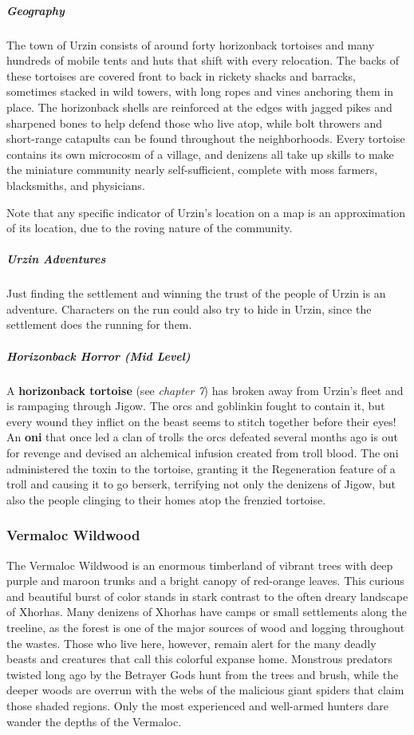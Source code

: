 \documentclass[10pt,a4paper,twoside,bg=print,twocolumn,openany,nodeprecatedcode]{dndbook}
\begin{document}
\subparagraph{Geography}
The town of Urzin consists of around forty horizonback tortoises and many hundreds of mobile tents and huts that shift with every relocation. The backs of these tortoises are covered front to back in rickety shacks and barracks, sometimes stacked in wild towers, with long ropes and vines anchoring them in place. The horizonback shells are reinforced at the edges with jagged pikes and sharpened bones to help defend those who live atop, while bolt throwers and short-range catapults can be found throughout the neighborhoods. Every tortoise contains its own microcosm of a village, and denizens all take up skills to make the miniature community nearly self-sufficient, complete with moss farmers, blacksmiths, and physicians.

Note that any specific indicator of Urzin's location on a map is an approximation of its location, due to the roving nature of the community.

\subparagraph{Urzin Adventures}
Just finding the settlement and winning the trust of the people of Urzin is an adventure. Characters on the run could also try to hide in Urzin, since the settlement does the running for them.

\subparagraph{Horizonback Horror (Mid Level)}
A \textbf{horizonback tortoise} (see \textit{chapter 7}) has broken away from Urzin's fleet and is rampaging through Jigow. The orcs and goblinkin fought to contain it, but every wound they inflict on the beast seems to stitch together before their eyes! An \textbf{oni} that once led a clan of trolls the orcs defeated several months ago is out for revenge and devised an alchemical infusion created from troll blood. The oni administered the toxin to the tortoise, granting it the Regeneration feature of a troll and causing it to go berserk, terrifying not only the denizens of Jigow, but also the people clinging to their homes atop the frenzied tortoise.

\subsubsection{Vermaloc Wildwood}
The Vermaloc Wildwood is an enormous timberland of vibrant trees with deep purple and maroon trunks and a bright canopy of red-orange leaves. This curious and beautiful burst of color stands in stark contrast to the often dreary landscape of Xhorhas. Many denizens of Xhorhas have camps or small settlements along the treeline, as the forest is one of the major sources of wood and logging throughout the wastes. Those who live here, however, remain alert for the many deadly beasts and creatures that call this colorful expanse home. Monstrous predators twisted long ago by the Betrayer Gods hunt from the trees and brush, while the deeper woods are overrun with the webs of the malicious giant spiders that claim those shaded regions. Only the most experienced and well-armed hunters dare wander the depths of the Vermaloc.
\end{document}
